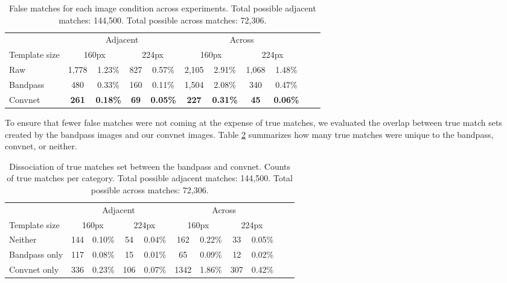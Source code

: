 \documentclass{article}
\begin{document}
 

\begin{table}[h]
    \caption{False matches for each image condition across experiments. Total possible adjacent matches: 144,500. Total possible across matches: 72,306.}
    \centering
     \small
    \begin{tabular}{l*{9}{c}r}
    
        \toprule
        &  \multicolumn{4}{c}{Adjacent}   &  \multicolumn{4}{c}{Across}\\
        \cmidrule{2-9}
        Template size    & \multicolumn{2}{c}{160px}  & \multicolumn{2}{c}{224px} & \multicolumn{2}{c}{160px} & \multicolumn{2}{c}{224px} \\
        \hline
        Raw             & 1,778 & 1.23\% & 827 & 0.57\% & 2,105 & 2.91\% & 1,068 & 1.48\% \\
        Bandpass        & 480 & 0.33\% & 160 & 0.11\% & 1,504 & 2.08\% & 340 & 0.47\% \\
        Convnet         & \textbf{261} & \textbf{0.18\%} & \textbf{69} & \textbf{0.05\%} & \textbf{227} & \textbf{0.31\%} & \textbf{45} & \textbf{0.06\%} &  \\
        \bottomrule
    \end{tabular}
\label{table:error_rates}
\end{table}

To ensure that fewer false matches were not coming at the expense of true matches, we evaluated the overlap between true match sets created by the bandpass images and our convnet images. Table \ref{table:true_overlap} summarizes how many true matches were unique to the bandpass, convnet, or neither.

\begin{table}[h]
\caption{Dissociation of true matches set between the bandpass and convnet. Counts of true matches per category. Total possible adjacent matches: 144,500. Total possible across matches: 72,306.}
\centering
\small
    \begin{tabular}{l*{9}{c}r}
        \toprule
        &  \multicolumn{4}{c}{Adjacent}   &  \multicolumn{4}{c}{Across}\\
        \cmidrule{2-9}
        Template size    & \multicolumn{2}{c}{160px}  & \multicolumn{2}{c}{224px} & \multicolumn{2}{c}{160px} & \multicolumn{2}{c}{224px} \\
        \hline
        Neither         & 144 & 0.10\% & 54 & 0.04\% & 162 & 0.22\% & 33 & 0.05\% &  \\
        Bandpass only             & 117 & 0.08\% & 15 & 0.01\% & 65 & 0.09\% & 12 & 0.02\% \\
        Convnet only        & 336 & 0.23\% & 106 & 0.07\% & 1342 & 1.86\% & 307 & 0.42\% \\
        \bottomrule
    \end{tabular}

\label{table:true_overlap}
\end{table}
\end{document}
